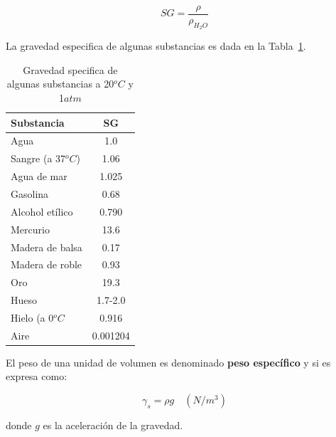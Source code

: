 \documentclass[10pt, oneside]{article}
\begin{document}
\begin{equation}
SG = \frac{\rho}{\rho_{H_2 O}} 
\end{equation}

La gravedad especifica de algunas substancias es dada en la Tabla~\ref{t1}.

\begin{table}[h!]
\centering
\begin{tabular}{l c}
 \hline
 Substancia & SG \\ [0.5ex]
 \hline\hline
 Agua &  1.0  \\ 
 Sangre (a 37$^oC$) &  1.06  \\ 
 Agua de mar &  1.025 \\ 
 Gasolina &  0.68 \\ 
 Alcohol et\'ilico &  0.790  \\ 
 Mercurio &  13.6  \\ 
 Madera de balsa &  0.17  \\ 
 Madera de roble &  0.93  \\ 
 Oro &  19.3  \\ 
 Hueso &  1.7-2.0  \\ 
 Hielo (a 0$^oC$ &  0.916  \\ 
 Aire & 0.001204  \\ [1ex]
 \hline
\end{tabular}
\caption{Gravedad specifica de algunas substancias a 20$^oC$ y 1$atm$}
\label{t1}
\end{table}


El peso de una unidad de volumen es denominado \textbf{peso espec\'ifico} y si es expresa como:

\begin{equation}
\gamma_s = \rho g \quad (N/m^3)
\end{equation}

donde $g$ es la aceleraci\'on de la gravedad. 
\end{document}

